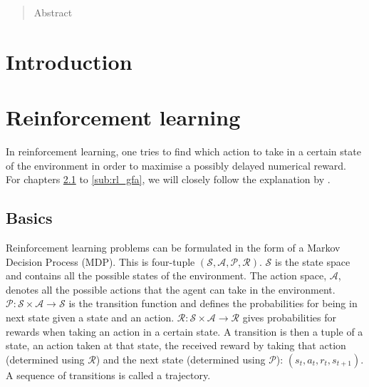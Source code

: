 \documentclass[a4paper, 11pt]{article}
\providecommand{\keywords}[1]{\textbf{\textit{Index terms---}} #1}
\begin{document}

\begin{abstract}
Abstract
\end{abstract}
\clearpage

\tableofcontents
\clearpage

\listoffigures
\clearpage

\listofalgorithms
\clearpage

\section{Introduction}
\section{Reinforcement learning}
In reinforcement learning, one tries to find which action to take in a certain state of the environment in order to maximise a possibly delayed numerical reward.\\
For chapters \ref{sub:rl_basics} to \ref{sub:rl_gfa}, we will closely follow the explanation by \cite{Sutton1998ReinforcementIntroduction}.

\subsection{Basics}
\label{sub:rl_basics}
Reinforcement learning problems can be formulated in the form of a Markov Decision Process (MDP). This is four-tuple $(\mathcal{S}, \mathcal{A}, \mathcal{P}, \mathcal{R})$. $\mathcal{S}$ is the state space and contains all the possible states of the environment. The action space, $\mathcal{A}$, denotes all the possible actions that the agent can take in the environment. $\mathcal{P}: \mathcal{S} \times \mathcal{A} \to \mathcal{S}$ is the transition function and defines the probabilities for being in next state given a state and an action. $\mathcal{R}: \mathcal{S} \times \mathcal{A} \to \mathcal{R}$ gives probabilities for rewards when taking an action in a certain state. A transition is then a tuple of a state, an action taken at that state, the received reward by taking that action (determined using $\mathcal{R}$) and the next state (determined using $\mathcal{P}$): $(s_t,a_t,r_t,s_{t+1})$. A sequence of transitions is called a trajectory.
\end{document}
